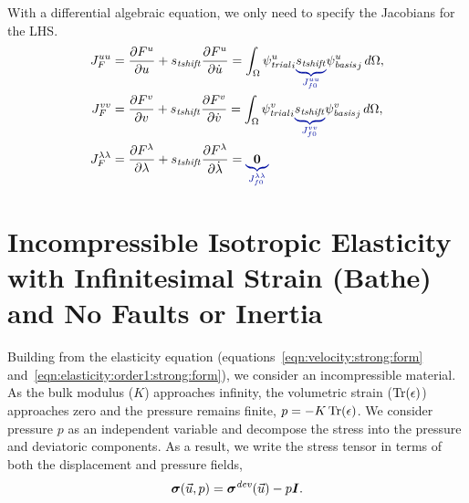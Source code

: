With a differential algebraic equation, we only need to specify the Jacobians for the LHS.
\begin{align}
  J_F^{uu} &= \frac{\partial F^u}{\partial u} + s_\mathit{tshift} \frac{\partial F^u}{\partial \dot{u}}
  = \int_\Omega \trialscalar[u]_i \eqnannotate{s_\mathit{tshift}}{J_{f0}^{uu}} \basisscalar[u]_j \, d\Omega, \\
%
  J_F^{vv} &= \frac{\partial F^v}{\partial v}  + s_\mathit{tshift} \frac{\partial F^v}{\partial \dot{v}}
  = \int_\Omega \trialscalar[v]_i \eqnannotate{s_\mathit{tshift}}{J_{f0}^{vv}} \basisscalar[v]_j \, d\Omega, \\
%
  J_F^{\lambda \lambda} &= \frac{\partial F^\lambda}{\partial \lambda} + s_\mathit{tshift} \frac{\partial F^\lambda}{\partial \dot{\lambda}}
  = \eqnannotate{\tensor{0}}{J_{f0}^{\lambda \lambda}}
\end{align}

\section{Incompressible Isotropic Elasticity with Infinitesimal Strain (Bathe) and No Faults or Inertia}

Building from the elasticity equation
(equations~\ref{eqn:velocity:strong:form}
and~\ref{eqn:elasticity:order1:strong:form}), we consider an
incompressible material. As the bulk modulus ($K$) approaches
infinity, the volumetric strain ($\operatorname{Tr}(\epsilon)$) approaches zero and
the pressure remains finite, $p = -K \operatorname{Tr}(\epsilon)$. We consider
pressure $p$ as an independent variable and decompose the stress into the
pressure and deviatoric components. As a result, we write the stress tensor in terms of both the displacement and pressure fields,
\begin{equation}
  \bm{\sigma}(\vec{u},p) = \bm{\sigma}^\mathit{dev}(\vec{u}) - p\bm{I}.
\end{equation}

